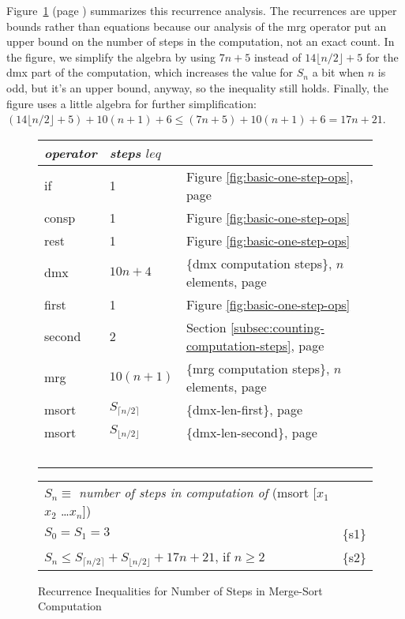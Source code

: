 Figure~\ref{msort-recurrences} (page \pageref{msort-recurrences})
summarizes this recurrence analysis.
The recurrences are upper bounds rather than equations because
our analysis of the mrg operator put an upper bound on
the number of steps in the computation, not an exact count.
In the figure, we simplify the algebra by using
$7n + 5$ instead of $14\lfloor n/2\rfloor + 5$
for the dmx part of the computation, which increases
the value for $S_n$ a bit when $n$ is odd, but it's
an upper bound, anyway, so the inequality still holds.
Finally, the figure uses a little algebra for further simplification:
$(14\lfloor n/2\rfloor + 5) + 10(n+1) + 6 \leq (7n + 5) + 10(n+1) + 6 = 17n + 21$.

\begin{figure}
\begin{center}
\begin{tabular}{lll}
  \emph{operator} & \emph{steps} $leq$ & \\
  \hline
   if     & 1 & Figure \ref{fig:basic-one-step-ops}, page \pageref{fig:basic-one-step-ops}  \\
   consp  & 1 & Figure \ref{fig:basic-one-step-ops}  \\
   rest   & 1 & Figure \ref{fig:basic-one-step-ops} \\
   dmx    & $10n+4$ & \{dmx computation steps\}, $n$ elements, page \pageref{fig:dmx-computation-time}\\
   first  & 1 & Figure \ref{fig:basic-one-step-ops} \\
   second & 2 & Section \ref{subsec:counting-computation-steps}, page \pageref{steps-in-second-op} \\
   mrg    & $10(n+1)$ & \{mrg computation steps\}, $n$ elements, page \pageref{thm:mrg-computation-time}\\
   msort  & $S_{\lceil  n/2 \rceil}$  & \{dmx-len-first\}, page \pageref{thm:dmx-length-first-second} \\
   msort  & $S_{\lfloor n/2 \rfloor}$ & \{dmx-len-second\}, page \pageref{thm:dmx-length-first-second} \\
   \hline
   ~~~~ & & \\
\end{tabular}

\begin{tabular}{ll}
   $S_n \equiv$ \emph{number of steps in computation of} (msort [$x_1$ $x_2$ \dots $x_n$]) \\
   $S_0 = S_1 = 3$ & \{s1\}\\
   $S_{n} \leq S_{\lceil n/2 \rceil} + S_{\lfloor n/2 \rfloor} + 17n + 21$, if $n \geq 2$ & \{s2\}\\
\end{tabular}
\end{center}
\caption{Recurrence Inequalities for Number of Steps in Merge-Sort Computation}
\label{msort-recurrences}
\end{figure}

